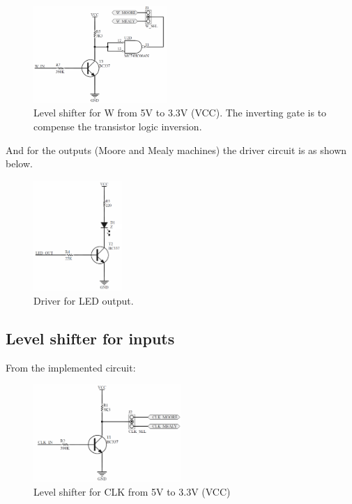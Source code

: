 \begin{figure}[H]
    \begin{centering}
    \includegraphics[width=0.45\textwidth]{data/Graficos3/W_Driver.png}
    \par\end{centering}
    \caption{Level shifter for W from 5V to 3.3V (VCC). The inverting gate is to compense the transistor logic inversion.}
\end{figure}

And for the outputs (Moore and Mealy machines) 
the driver circuit is as shown below.

\begin{figure}[H]
    \begin{centering}
    \includegraphics[width=0.3\textwidth]{data/Graficos3/LED_Driver.png}
    \par\end{centering}
    \caption{Driver for LED output.}
\end{figure}


\newpage

\subsection*{Level shifter for inputs}
From the implemented circuit:
\begin{figure}[H]
    \begin{centering}
    \includegraphics[width=0.5\textwidth]{data/Graficos3/CLK_Driver.png}
    \par\end{centering}
    \caption{Level shifter for CLK from 5V to 3.3V (VCC)}
\end{figure}


